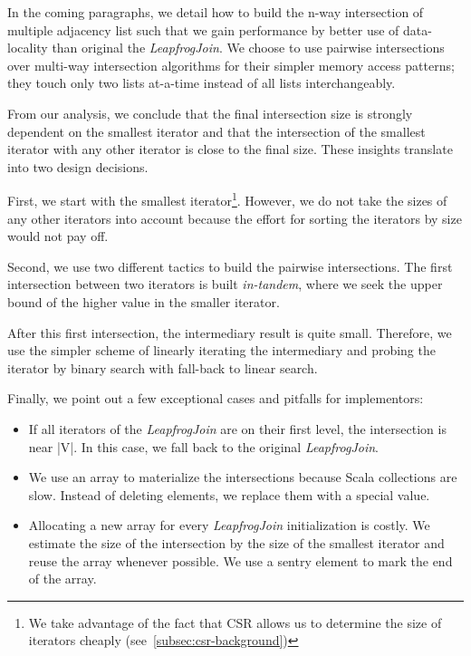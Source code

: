 In the coming paragraphs, we detail how to build the n-way intersection of multiple adjacency list
such that we gain performance by better use of data-locality than original the \textit{LeapfrogJoin}.
We choose to use pairwise intersections over multi-way intersection algorithms for their simpler memory access patterns;
they touch only two lists at-a-time instead of all lists interchangeably.

From our analysis, we conclude that the final intersection size is strongly dependent on the
smallest iterator and that the intersection of the smallest iterator with any other iterator is
close to the final size.
These insights translate into two design decisions.

First, we start with the smallest iterator\footnote{We take advantage of the fact that CSR allows us
to determine the size of iterators cheaply (see~\cref{subsec:csr-background})}.
However, we do not take the sizes of any other iterators into account because the effort for
sorting the iterators by size would not pay off.

Second, we use two different tactics to build the pairwise intersections.
The first intersection between two iterators is built \textit{in-tandem},  where we seek
the upper bound of the higher value in the smaller iterator.

After this first intersection, the intermediary result is quite small.
Therefore, we use the simpler scheme of linearly iterating the intermediary and probing
the iterator by binary search with fall-back to linear search.

Finally, we point out a few exceptional cases and pitfalls for implementors:
\begin{itemize}
    \item If all iterators of the \textit{LeapfrogJoin} are on their first level, the intersection is near |V|. In this case, we fall back
    to the original
    \textit{LeapfrogJoin}.
    \item We use an array to materialize the intersections because Scala collections are slow.
    Instead of deleting elements, we replace them with a special value.
    \item Allocating a new array for every \textit{LeapfrogJoin} initialization is costly.
    We estimate the size of the intersection by the size of the smallest iterator and reuse the array whenever possible. We use a sentry element to mark the end of the array.
\end{itemize}

